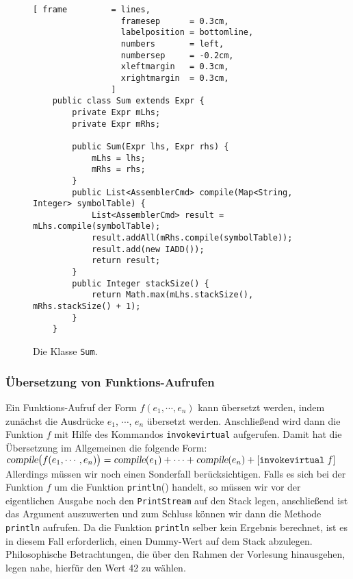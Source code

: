 \begin{figure}[!ht]
\centering
\begin{Verbatim}[ frame         = lines, 
                  framesep      = 0.3cm, 
                  labelposition = bottomline,
                  numbers       = left,
                  numbersep     = -0.2cm,
                  xleftmargin   = 0.3cm,
                  xrightmargin  = 0.3cm,
                ]
    public class Sum extends Expr {
        private Expr mLhs;
        private Expr mRhs;
    
        public Sum(Expr lhs, Expr rhs) {
            mLhs = lhs;
            mRhs = rhs;
        }
        public List<AssemblerCmd> compile(Map<String, Integer> symbolTable) {
            List<AssemblerCmd> result = mLhs.compile(symbolTable);
            result.addAll(mRhs.compile(symbolTable));
            result.add(new IADD());
            return result;
        }
        public Integer stackSize() {
            return Math.max(mLhs.stackSize(), mRhs.stackSize() + 1);
        }
    }
\end{Verbatim}
\vspace*{-0.3cm}
\caption{Die Klasse \texttt{Sum}.}
\label{fig:Expr:Sum.java}
\end{figure}



\subsubsection{\"Ubersetzung von Funktions-Aufrufen}
Ein Funktions-Aufruf der Form $f(e_1, \cdots, e_n)$ kann \"ubersetzt werden, indem zun\"achst die
Ausdr\"ucke $e_1$, $\cdots$, $e_n$ \"ubersetzt werden.  Anschlie{\ss}end wird dann die Funktion
$f$ mit Hilfe des Kommandos \texttt{invokevirtual} aufgerufen.  
 Damit hat die \"Ubersetzung im Allgemeinen die folgende Form:
\\[0.2cm]
$ \textsl{compile}\bigl(f(e_1,\cdots,e_n)\bigr) = 
   \textsl{compile}(e_1) + \cdots + \textsl{compile}(e_n) + [ \texttt{invokevirtual}\; f] 
$
\\[0.2cm]
Allerdings m\"ussen wir noch einen Sonderfall ber\"ucksichtigen. Falls es sich bei der Funktion $f$
um die Funktion \texttt{println}() handelt, so m\"ussen wir vor der eigentlichen Ausgabe
noch den \texttt{PrintStream} auf den Stack legen, anschlie{\ss}end ist das Argument auszuwerten und zum
Schluss k\"onnen wir dann die Methode \texttt{println} aufrufen.  Da die Funktion \texttt{println}
selber kein Ergebnis berechnet, ist es in diesem Fall erforderlich, einen Dummy-Wert auf dem Stack abzulegen.
Philosophische Betrachtungen, die \"uber den Rahmen der Vorlesung hinausgehen, legen nahe, hierf\"ur den
Wert 42 zu w\"ahlen. 


